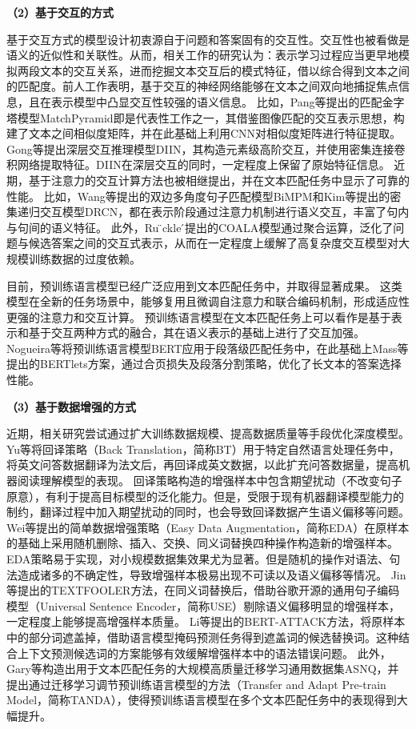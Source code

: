\textbf{\songti （2）基于交互的方式}

基于交互方式的模型设计初衷源自于问题和答案固有的交互性。交互性也被看做是语义的近似性和关联性。从而，相关工作的研究认为：表示学习过程应当更早地模拟两段文本的交互关系，进而挖掘文本交互后的模式特征，借以综合得到文本之间的匹配度。前人工作表明，基于交互的神经网络能够在文本之间双向地捕捉焦点信息，且在表示模型中凸显交互性较强的语义信息。
比如，Pang等提出的匹配金字塔模型MatchPyramid\cite{pang2016text}即是代表性工作之一，其借鉴图像匹配的交互表示思想，构建了文本之间相似度矩阵，并在此基础上利用CNN对相似度矩阵进行特征提取。Gong等提出深层交互推理模型DIIN\cite{gong2017natural}，其构造元素级高阶交互，并使用密集连接卷积网络提取特征。DIIN在深层交互的同时，一定程度上保留了原始特征信息。
近期，基于注意力的交互计算方法也被相继提出，并在文本匹配任务中显示了可靠的性能。
比如，Wang等提出的双边多角度句子匹配模型BiMPM\cite{wang2017bilateral}和Kim等提出的密集递归交互模型DRCN\cite{kim2019semantic}，都在表示阶段通过注意力机制进行语义交互，丰富了句内与句间的语义特征。
此外，Ru ̈ckle ́提出的COALA\cite{ruckle2019coala}模型通过聚合运算，泛化了问题与候选答案之间的交互式表示，从而在一定程度上缓解了高复杂度交互模型对大规模训练数据的过度依赖。

目前，预训练语言模型已经广泛应用到文本匹配任务中，并取得显著成果。
这类模型在全新的任务场景中，能够复用且微调自注意力和联合编码机制，形成适应性更强的注意力和交互计算。
预训练语言模型在文本匹配任务上可以看作是基于表示和基于交互两种方式的融合，其在语义表示的基础上进行了交互加强。
Nogueira\cite{nogueira2019passage}等将预训练语言模型BERT应用于段落级匹配任务中，在此基础上Mass等提出的BERTlets\cite{mass2019study}方案，通过合页损失及段落分割策略，优化了长文本的答案选择性能。

\textbf{\songti （3）基于数据增强的方式}

近期，相关研究尝试通过扩大训练数据规模、提高数据质量等手段优化深度模型。
Yu等将回译策略（Back Translation，简称BT）\cite{yu2018qanet}用于特定自然语言处理任务中，将英文问答数据翻译为法文后，再回译成英文数据，以此扩充问答数据量，提高机器阅读理解模型的表现。
回译策略构造的增强样本中包含期望扰动（不改变句子原意），有利于提高目标模型的泛化能力。但是，受限于现有机器翻译模型能力的制约，翻译过程中加入期望扰动的同时，也会导致回译数据产生语义偏移等问题。
Wei等提出的简单数据增强策略（Easy Data Augmentation，简称EDA）\cite{wei2019eda}在原样本的基础上采用随机删除、插入、交换、同义词替换四种操作构造新的增强样本。EDA策略易于实现，对小规模数据集效果尤为显著。但是随机的操作对语法、句法造成诸多的不确定性，导致增强样本极易出现不可读以及语义偏移等情况。
Jin等提出的TEXTFOOLER\cite{jin2020bert}方法，在同义词替换后，借助谷歌开源的通用句子编码模型（Universal Sentence Encoder，简称USE）\cite{cer2018universal}剔除语义偏移明显的增强样本，一定程度上能够提高增强样本质量。
Li等提出的BERT-ATTACK\cite{li2020bert}方法，将原样本中的部分词遮盖掉，借助语言模型掩码预测任务得到遮盖词的候选替换词。这种结合上下文预测候选词的方案能够有效缓解增强样本中的语法错误问题。
此外，Gary等\cite{garg2020tanda}构造出用于文本匹配任务的大规模高质量迁移学习通用数据集ASNQ，并提出通过迁移学习调节预训练语言模型的方法（Transfer and Adapt Pre-train Model，简称TANDA），使得预训练语言模型在多个文本匹配任务中的表现得到大幅提升。



